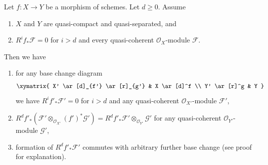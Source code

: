 %
\begin{lemma}
\label{lemma-top-cohomology-functor}
Let $f : X \to Y$ be a morphism of schemes. Let $d \geq 0$. Assume
\begin{enumerate}
\item $X$ and $Y$ are quasi-compact and quasi-separated, and
\item $R^if_*\mathcal{F} = 0$ for $i > d$ and
every quasi-coherent $\mathcal{O}_X$-module $\mathcal{F}$.
\end{enumerate}
Then we have
\begin{enumerate}
\item[(a)] for any base change diagram
$$
\xymatrix{
X' \ar[d]_{f'} \ar[r]_{g'} & X \ar[d]^f \\
Y' \ar[r]^g & Y
}
$$
we have $R^if'_*\mathcal{F}' = 0$ for $i > d$ and any quasi-coherent
$\mathcal{O}_{X'}$-module $\mathcal{F}'$,
\item[(b)]
$R^df'_*(\mathcal{F}' \otimes_{\mathcal{O}_{X'}} (f')^*\mathcal{G}') =
R^df'_*\mathcal{F}' \otimes_{\mathcal{O}_{Y'}} \mathcal{G}'$
for any quasi-coherent $\mathcal{O}_{Y'}$-module $\mathcal{G}'$,
\item[(c)] formation of $R^df'_*\mathcal{F}'$ commutes with arbitrary
further base change (see proof for explanation).
\end{enumerate}
\end{lemma}


